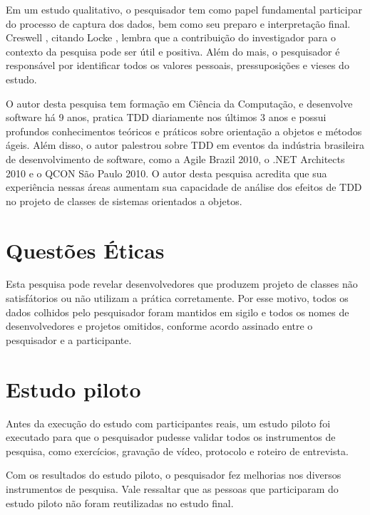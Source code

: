 Em um estudo qualitativo, o pesquisador tem como papel fundamental participar do 
processo de captura dos dados, bem como seu preparo e interpretação final.
Creswell \cite{creswell}, citando Locke \cite{locke}, lembra
que a contribuição do investigador para o contexto da pesquisa pode ser útil e
positiva. Além do mais, o pesquisador é responsável por
identificar todos os valores pessoais, pressuposições e vieses do estudo.

O autor desta pesquisa tem formação em Ciência da Computação, e desenvolve software há 9
anos, pratica TDD diariamente nos últimos 3 anos e possui profundos
conhecimentos teóricos e práticos sobre orientação a objetos e métodos ágeis.
Além disso, o autor palestrou sobre TDD em eventos da indústria brasileira
de desenvolvimento de software, como a Agile Brazil 2010, o .NET Architects
2010 e o QCON São Paulo 2010. O autor desta pesquisa acredita que sua experiência nessas
áreas aumentam sua capacidade de análise dos efeitos de TDD no projeto de classes de sistemas 
orientados a objetos.

\section{Questões Éticas}
\label{sec:planejamento-etica}

Esta pesquisa pode revelar desenvolvedores que produzem projeto de classes não
satisfátorios ou não utilizam a prática corretamente.
Por esse motivo, todos os dados colhidos pelo pesquisador foram mantidos em
sigilo e todos os nomes de desenvolvedores e projetos omitidos, conforme acordo 
assinado entre o pesquisador e a participante.

\section{Estudo piloto}
\label{sec:estudo-piloto}

Antes da execução do estudo com participantes reais, um estudo piloto foi
executado para que o pesquisador pudesse validar todos os instrumentos de pesquisa,
como exercícios, gravação de vídeo, protocolo e roteiro de entrevista.

Com os resultados do estudo piloto, o pesquisador fez melhorias
nos diversos instrumentos de pesquisa.
Vale ressaltar que as pessoas que participaram do estudo piloto não foram reutilizadas no
estudo final.

